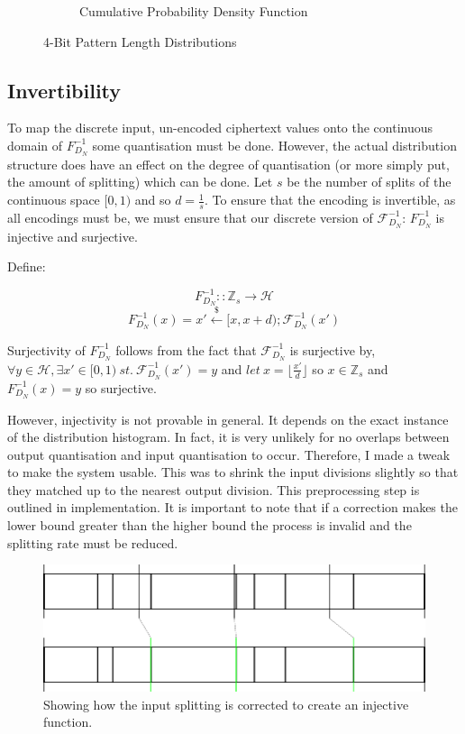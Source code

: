 \documentclass[ %
                    author={Samuel Russell},
                supervisor={Prof. Bogdan Warinschi},
                    degree={MEng},
                     title={Innocuous Ciphertexts},
                  subtitle={The DE-CENSOR Scheme},
                      type={research},
                      year={2018} ]{dissertation}
\begin{document}
\begin{figure}[h]
\begin{subfigure}[b]{.49\linewidth}
\begin{tikzpicture}
\end{tikzpicture}
\caption{Cumulative Probability Density Function}
\label{fig:cum_dist_pat4}
\end{subfigure}
\caption{4-Bit Pattern Length Distributions}
\label{fig:cum_conv}
\end{figure}



\subsection{Invertibility}\label{invertibility}

To map the discrete input, un-encoded ciphertext values onto the continuous domain of $F^{-1}_{D_N}$ some quantisation must be done.
However, the actual distribution structure does have an effect on the degree of quantisation (or more simply put, the amount of splitting) which can be done.
Let $s$ be the number of splits of the continuous space $[0,1)$ and so $d = \frac{1}{s}$.
To ensure that the encoding is invertible, as all encodings must be, we must ensure that our discrete version of $\mathcal{F}^{-1}_{D_N}$: $F^{-1}_{D_N}$ is injective and surjective.

Define:

$$F^{-1}_{D_N} :: \mathbb{Z}_s \rightarrow \mathcal{H}$$
$$F^{-1}_{D_N}(x) = x' \xleftarrow{\$} [x, x+d); \mathcal{F}^{-1}_{D_N}(x')$$

Surjectivity of $F^{-1}_{D_N}$ follows from the fact that $\mathcal{F}^{-1}_{D_N}$ is surjective by, $\forall y \in \mathcal{H}, \exists x' \in [0,1)\ st.\ \mathcal{F}^{-1}_{D_N}(x') = y$ and $ let\ x = \lfloor \frac{x'}{d} \rfloor$ so $x \in \mathbb{Z}_s$ and $F^{-1}_{D_N}(x) = y$ so surjective.

However, injectivity is not provable in general. It depends on the exact instance of the distribution histogram.
In fact, it is very unlikely for no overlaps between output quantisation and input quantisation to occur.
Therefore, I made a tweak to make the system usable.
This was to shrink the input divisions slightly so that they matched up to the nearest output division.
This preprocessing step is outlined in implementation.
It is important to note that if a correction makes the lower bound greater than the higher bound the process is invalid and the splitting rate must be reduced.

\begin{figure}[h]
\centering
\includegraphics[scale=.9]{correction}
\caption{Showing how the input splitting is corrected to create an injective function.}
\label{correction}
\end{figure}
\end{document}
